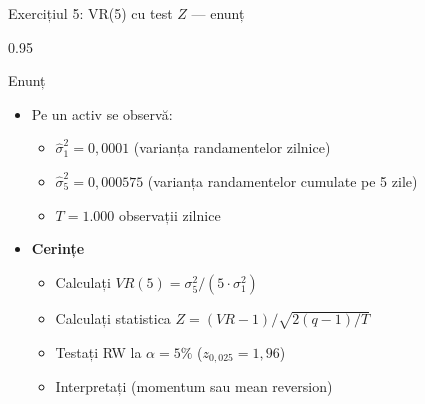 \documentclass[9pt, aspectratio=169, t]{beamer}
\begin{document}
\begin{frame}[shrink=15]{Exercițiul 5: VR(5) cu test $Z$ --- enunț}
\begin{cminipage}{0.95\textwidth}
\begin{block}{Enunț}
\begin{itemize}\setlength{\itemsep}{0pt}
    \item Pe un activ se observă:
    \begin{itemize}\setlength{\itemsep}{0pt}
        \item $\hat\sigma^2_1 = 0{,}0001$ (varianța randamentelor zilnice)
        \item $\hat\sigma^2_5 = 0{,}000575$ (varianța randamentelor cumulate pe 5 zile)
        \item $T = 1.000$ observații zilnice
    \end{itemize}
\end{itemize}
\end{block}

\begin{itemize}\setlength{\itemsep}{0pt}
    \item \textbf{Cerințe}
    \begin{itemize}\setlength{\itemsep}{0pt}
        \item Calculați $VR(5) = \sigma^2_5 / (5 \cdot \sigma^2_1)$
        \item Calculați statistica $Z = (VR - 1)/\sqrt{2(q-1)/T}$
        \item Testați RW la $\alpha = 5\%$ ($z_{0{,}025} = 1{,}96$)
        \item Interpretați (momentum sau mean reversion)
    \end{itemize}
\end{itemize}
\end{cminipage}
\end{frame}
\end{document}
